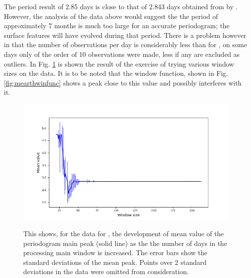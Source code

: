 The period result of 2.85 days is close to that of 2.843 days obtained from
{\MEarth} by \citet{newton18}. However, the analysis of the {\ktwo} data above
would suggest the the period of approximately 7 months is much too large for an
accurate periodogram; the surface features will have evolved during that period.
There is a problem however in that the number of observations per day is
considerably less than for \ktwo, on some days only of the order of 10
observations were made, less if any are excluded as outliers. In Fig.
\ref{fig:mearthwinsizes} is shown the result of the exercise of trying various
window sizes on the data. It is to be noted that the window function, shown in
Fig. \ref{fig:mearthwinfunc} shows a peak close to this value and possibly
interferes with it.

\begin{figure}[!htbp]
\begin{center}
\includegraphics[scale=0.40]{mearth/images/mearthwinsizes.png} \\
\vspace{-.5cm}
\end{center}
\caption{This shows, for the {\MEarth} data for \ross, the development of mean
value of the periodogram main peak (solid line) as the the number of days in
the processing main window is increased. The error bars show the standard
deviations of the mean peak. Points over 2 standard deviations in the data were
omitted from consideration.}\protect\label{fig:mearthwinsizes}
\end{figure}

